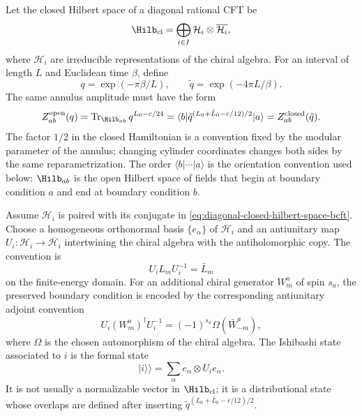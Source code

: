 Let the closed Hilbert space of a diagonal rational CFT be
\begin{equation}
  \Hilb_{\mathrm{cl}}
  =
  \bigoplus_{i\in I}
  \mathcal H_i\otimes\overline{\mathcal H_i},
  \label{eq:diagonal-closed-hilbert-space-bcft}
\end{equation}
where \(\mathcal H_i\) are irreducible representations of the chiral algebra.
For an interval of length \(L\) and Euclidean time \(\beta\), define
\[
  q=\exp(-\pi\beta/L),
  \qquad
  \tilde q=\exp(-4\pi L/\beta).
\]
The same annulus amplitude must have the form
\begin{equation}
  Z_{ab}^{\mathrm{open}}(q)
  =
  \operatorname{Tr}_{\Hilb_{ab}}q^{L_0-c/24}
  =
  \langle b|
  \tilde q^{(L_0+\bar L_0-c/12)/2}
  |a\rangle
  =
  Z_{ab}^{\mathrm{closed}}(\tilde q).
  \label{eq:bcft-open-closed-annulus}
\end{equation}
The factor \(1/2\) in the closed Hamiltonian is a convention fixed by the
modular parameter of the annulus; changing cylinder coordinates changes both
sides by the same reparametrization.  The order
\(\langle b|\cdots|a\rangle\) is the orientation convention used below:
\(\Hilb_{ab}\) is the open Hilbert space of fields that begin at boundary
condition \(a\) and end at boundary condition \(b\).

\begin{definition}
\label{def:ishibashi-state}
Assume \(\mathcal H_i\) is paired with its conjugate in
\eqref{eq:diagonal-closed-hilbert-space-bcft}.  Choose a homogeneous
orthonormal basis \(\{e_\alpha\}\) of \(\mathcal H_i\) and an antiunitary
map \(U_i:\mathcal H_i\to\overline{\mathcal H_i}\) intertwining the chiral
algebra with the antiholomorphic copy.  The convention is
\begin{equation}
  U_i L_m U_i^{-1}=\bar L_m
  \label{eq:ishibashi-antiunitary-convention}
\end{equation}
on the finite-energy domain.  For an additional chiral generator \(W^a_m\) of
spin \(s_a\), the preserved boundary condition is encoded by the corresponding
antiunitary adjoint convention
\begin{equation}
  U_i (W^a_m)^\dagger U_i^{-1}
  =
  (-1)^{s_a}\Omega(\bar W^a_{-m}),
  \label{eq:ishibashi-current-antiunitary-convention}
\end{equation}
where \(\Omega\) is the chosen automorphism of the chiral algebra.  The
Ishibashi state associated to \(i\) is the formal state
\begin{equation}
  |i\rangle\!\rangle
  =
  \sum_\alpha e_\alpha\otimes U_i e_\alpha .
  \label{eq:ishibashi-state-definition}
\end{equation}
It is not usually a normalizable vector in \(\Hilb_{\mathrm{cl}}\); it is a
distributional state whose overlaps are defined after inserting
\(\tilde q^{(L_0+\bar L_0-c/12)/2}\).
\end{definition}

